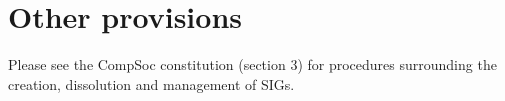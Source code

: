 \section{Other provisions}
Please see the CompSoc constitution (section 3) for procedures surrounding the creation, dissolution and management of SIGs.